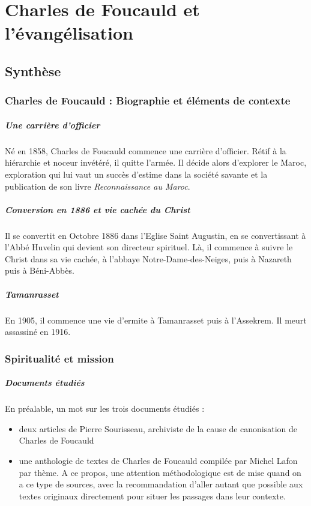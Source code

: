 \chapter{Charles de Foucauld et l'évangélisation}

\section{Synthèse}

\subsection{Charles de Foucauld : Biographie et éléments de contexte}

\paragraph{Une carrière d'officier} Né en 1858, Charles de Foucauld commence une carrière d'officier. Rétif à la hiérarchie et noceur invétéré, il quitte l'armée. Il décide alors d'explorer le Maroc, exploration qui lui vaut un succès d'estime dans la société savante et la publication de son livre \textit{Reconnaissance au Maroc}.

\paragraph{Conversion en 1886 et vie cachée du Christ} Il se convertit en Octobre 1886 dans l'Eglise Saint Augustin, en se convertissant à l'Abbé Huvelin qui devient son directeur spirituel. Là, il commence à suivre le Christ dans sa vie cachée, à l'abbaye Notre-Dame-des-Neiges, puis à Nazareth puis à Béni-Abbès.

\paragraph{Tamanrasset} En 1905, il commence une vie d'ermite à Tamanrasset puis à l'Assekrem. Il meurt assassiné en 1916.

\subsection{Spiritualité et mission}

\paragraph{Documents étudiés} En préalable, un mot sur les trois documents étudiés : 
\begin{itemize}
    \item deux articles de Pierre Sourisseau, archiviste de la cause de canonisation de Charles de Foucauld
    \item une anthologie de textes de Charles de Foucauld compilée par Michel Lafon par thème. A ce propos, une attention méthodologique est de mise quand on a ce type de sources, avec la recommandation d'aller autant que possible aux textes originaux directement pour situer les passages dans leur contexte.
\end{itemize}




